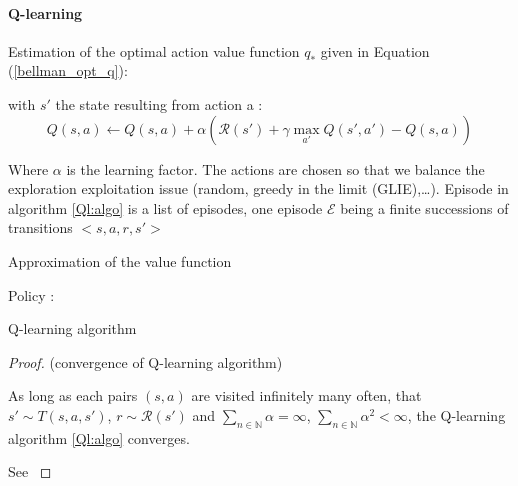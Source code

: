 \documentclass[14pt,a4paper]{article}
\theoremstyle{definition}
\begin{document}
\paragraph{Q-learning} Estimation of the optimal action value function $q_*$ given in Equation (\ref{bellman_opt_q}):


with $s'$ the state resulting from action a :
\begin{equation}
Q(s,a) \leftarrow Q(s,a) + \alpha \left( \mathcal{R}(s') + \gamma \max_{a'}Q(s',a') - Q(s,a) \right) 
\label{eq:ql}
\end{equation}

Where $\alpha$ is the learning factor. The actions are chosen so that we balance the exploration exploitation issue (random, greedy in the limit (GLIE),\ldots). Episode in algorithm \ref{Ql:algo} is a list of episodes, one episode $\mathcal{E}$ being a finite successions of transitions  $<s,a,r,s'>$

\begin{algorithm}
    
	
	Approximation of the value function
     
     Policy  : \\
     
	\caption{Q-learning algorithm}
	\label{Ql:algo}
\end{algorithm}

\begin{proof} (convergence of Q-learning algorithm)

As long as each pairs $(s,a)$ are visited infinitely many often, that $s'\sim T(s,a,s')$, $r \sim \mathcal{R}(s')$ and  $\underset{n \in \mathbb{N}}{\sum} \alpha = \infty$, $\underset{n \in \mathbb{N}}{\sum} \alpha^2 < \infty$, the Q-learning algorithm \ref{Ql:algo} converges.

See \citep{Watkins_article}

\end{proof}
\end{document}
